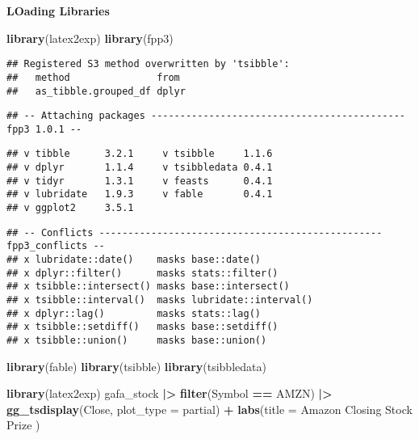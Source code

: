 \documentclass[
]{article}
\newenvironment{Shaded}{\begin{snugshade}}{\end{snugshade}}
\newcommand{\AttributeTok}[1]{\textcolor[rgb]{0.13,0.29,0.53}{#1}}
\newcommand{\FunctionTok}[1]{\textcolor[rgb]{0.13,0.29,0.53}{\textbf{#1}}}
\newcommand{\NormalTok}[1]{#1}
\newcommand{\SpecialCharTok}[1]{\textcolor[rgb]{0.81,0.36,0.00}{\textbf{#1}}}
\newcommand{\StringTok}[1]{\textcolor[rgb]{0.31,0.60,0.02}{#1}}
\begin{document}
\textbf{LOading Libraries}

\begin{Shaded}
\begin{Highlighting}[]
\FunctionTok{library}\NormalTok{(latex2exp)}
\FunctionTok{library}\NormalTok{(fpp3)}
\end{Highlighting}
\end{Shaded}

\begin{verbatim}
## Registered S3 method overwritten by 'tsibble':
##   method               from 
##   as_tibble.grouped_df dplyr
\end{verbatim}

\begin{verbatim}
## -- Attaching packages -------------------------------------------- fpp3 1.0.1 --
\end{verbatim}

\begin{verbatim}
## v tibble      3.2.1     v tsibble     1.1.6
## v dplyr       1.1.4     v tsibbledata 0.4.1
## v tidyr       1.3.1     v feasts      0.4.1
## v lubridate   1.9.3     v fable       0.4.1
## v ggplot2     3.5.1
\end{verbatim}

\begin{verbatim}
## -- Conflicts ------------------------------------------------- fpp3_conflicts --
## x lubridate::date()    masks base::date()
## x dplyr::filter()      masks stats::filter()
## x tsibble::intersect() masks base::intersect()
## x tsibble::interval()  masks lubridate::interval()
## x dplyr::lag()         masks stats::lag()
## x tsibble::setdiff()   masks base::setdiff()
## x tsibble::union()     masks base::union()
\end{verbatim}

\begin{Shaded}
\begin{Highlighting}[]
\FunctionTok{library}\NormalTok{(fable)}
\FunctionTok{library}\NormalTok{(tsibble)}
\FunctionTok{library}\NormalTok{(tsibbledata)}
\end{Highlighting}
\end{Shaded}

\begin{Shaded}
\begin{Highlighting}[]
\FunctionTok{library}\NormalTok{(latex2exp)}
\NormalTok{gafa\_stock }\SpecialCharTok{|\textgreater{}} \FunctionTok{filter}\NormalTok{(Symbol }\SpecialCharTok{==} \StringTok{\textquotesingle{}AMZN\textquotesingle{}}\NormalTok{) }\SpecialCharTok{|\textgreater{}}
  \FunctionTok{gg\_tsdisplay}\NormalTok{(Close, }\AttributeTok{plot\_type =}  \StringTok{\textquotesingle{}partial\textquotesingle{}}\NormalTok{) }\SpecialCharTok{+} 
  \FunctionTok{labs}\NormalTok{(}\AttributeTok{title =} \StringTok{\textquotesingle{}Amazon Closing Stock Prize \textquotesingle{}}\NormalTok{ )}
\end{Highlighting}
\end{Shaded}
\end{document}
